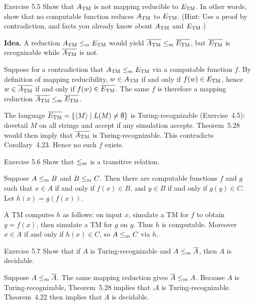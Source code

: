 \begin{question}{Exercise 5.5}
Show that $A_{\mathrm{TM}}$ is not mapping reducible to $E_{\mathrm{TM}}$. In other words, show that no computable function reduces $A_{\mathrm{TM}}$ to $E_{\mathrm{TM}}$. (Hint: Use a proof by contradiction, and facts you already know about $A_{\mathrm{TM}}$ and $E_{\mathrm{TM}}$.)
\end{question}
\begin{soln}
\textbf{Idea.} A reduction $A_{\mathrm{TM}}\le_{m}E_{\mathrm{TM}}$ would yield $\overline{A_{\mathrm{TM}}}\le_{m}\overline{E_{\mathrm{TM}}}$, but $\overline{E_{\mathrm{TM}}}$ is recognizable while $\overline{A_{\mathrm{TM}}}$ is not.

Suppose for a contradiction that $A_{\mathrm{TM}}\le_{m}E_{\mathrm{TM}}$ via a computable function $f$. By definition of mapping reducibility, $w\in A_{\mathrm{TM}}$ if and only if $f(w)\in E_{\mathrm{TM}}$, hence $w\in\overline{A_{\mathrm{TM}}}$ if and only if $f(w)\in\overline{E_{\mathrm{TM}}}$. The same $f$ is therefore a mapping reduction $\overline{A_{\mathrm{TM}}}\le_{m}\overline{E_{\mathrm{TM}}}$.

The language $\overline{E_{\mathrm{TM}}}=\{\langle M\rangle\mid L(M)\ne\emptyset\}$ is Turing-recognizable (Exercise~4.5): dovetail $M$ on all strings and accept if any simulation accepts. Theorem~5.28 would then imply that $\overline{A_{\mathrm{TM}}}$ is Turing-recognizable. This contradicts Corollary~4.23. Hence no such $f$ exists.
\end{soln}

\begin{question}{Exercise 5.6}
Show that $\le_{m}$ is a transitive relation.
\end{question}
\begin{soln}
Suppose $A\le_{m} B$ and $B\le_{m} C$. Then there are computable functions $f$ and $g$ such that $x\in A$ if and only if $f(x)\in B$, and $y\in B$ if and only if $g(y)\in C$. Let $h(x)=g(f(x))$.

A TM computes $h$ as follows: on input $x$, simulate a TM for $f$ to obtain $y=f(x)$, then simulate a TM for $g$ on $y$. Thus $h$ is computable. Moreover $x\in A$ if and only if $h(x)\in C$, so $A\le_{m} C$ via $h$.
\end{soln}

\begin{question}{Exercise 5.7}
Show that if $A$ is Turing-recognizable and $A\le_{m}\overline{A}$, then $A$ is decidable.
\end{question}
\begin{soln}
Suppose $A\le_{m}\overline{A}$. The same mapping reduction gives $\overline{A}\le_{m} A$. Because $A$ is Turing-recognizable, Theorem~5.28 implies that $\comp{A}$ is Turing-recognizable. Theorem~4.22 then implies that $A$ is decidable.
\end{soln}

